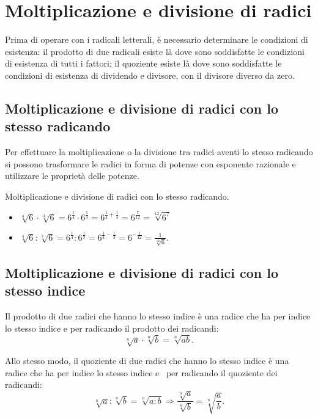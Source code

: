 \section{Moltiplicazione e divisione di radici}
\label{sec:radici_moltiplicazione}

Prima di operare con i radicali letterali, è necessario determinare le 
condizioni di esistenza: il prodotto di due radicali esiste là dove sono 
soddisfatte le condizioni di esistenza di tutti i fattori; 
il quoziente esiste là dove sono soddisfatte le condizioni di esistenza di 
dividendo e divisore, con il divisore diverso da zero.

\subsection{Moltiplicazione e divisione di radici con lo stesso radicando}
Per effettuare la moltiplicazione o la divisione tra radici aventi lo stesso 
radicando si possono trasformare le radici in forma di potenze con esponente 
razionale e utilizzare le proprietà delle potenze.

\begin{exrig}
 \begin{esempio}
Moltiplicazione e divisione di radici con lo stesso radicando.
\begin{itemize}
\item \(\sqrt[4]6\cdot \sqrt[3]6=6^{\frac 1 4}\cdot 6^{\frac 1 3}=
       6^{\frac 1 4+\frac 1 3}=6^{\frac 7{12}}=\sqrt[12]{6^7}\)
\item \(\sqrt[4]6:\sqrt[3]6=6^{\frac 1 4}:6^{\frac 1 3}=
       6^{\frac 1 4-\frac 1 3}=6^{-\frac 1{12}}=\frac 1{\sqrt[12]6}\).
\end{itemize}
 \end{esempio}
\end{exrig}

\subsection{Moltiplicazione e divisione di radici con lo stesso indice}
Il prodotto di due radici che hanno lo stesso indice è una radice che ha per 
indice lo stesso indice e per radicando il prodotto dei radicandi:
\[\sqrt[n]a\cdot \sqrt[n]b=\sqrt[n]{ab}.\]

Allo stesso modo, il quoziente di due radici che hanno lo stesso indice è una 
radice che ha per indice lo stesso indice e \ per radicando il quoziente dei 
radicandi:
\[\sqrt[n]a:\sqrt[n]b=\sqrt[n]{a:b} \Rightarrow \dfrac{\sqrt[n]a}{\sqrt[n]b}=
  \sqrt[n]{\dfrac a b}.\]


